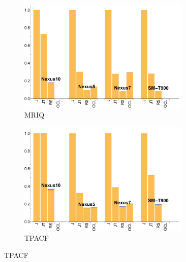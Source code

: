 \begin{figure}[t]
  \begin{subfigure}[b]{0.5\textwidth}
      \centering
      \includegraphics[width=0.9\textwidth]{data/Mriq_time.pdf}
      \caption{MRIQ}
      \label{fig:MRIQ}
  \end{subfigure}
  \begin{subfigure}[b]{0.5\textwidth}
      \centering
      \includegraphics[width=0.9\textwidth]{data/Tpacf_time.pdf}
      \caption{TPACF}
      \label{fig:TPACF}
  \end{subfigure}


\end{figure}
